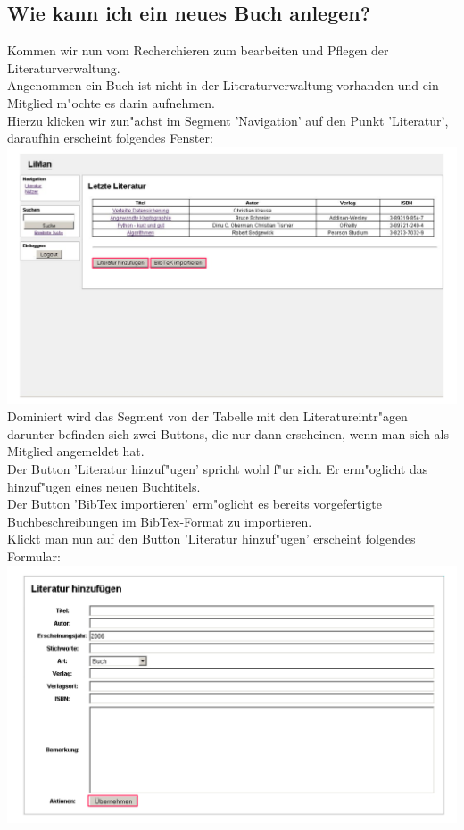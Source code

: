 \subsection{Wie kann ich ein neues Buch anlegen?}
Kommen wir nun vom Recherchieren zum bearbeiten und Pflegen der Literaturverwaltung.\\
Angenommen ein Buch ist nicht in der Literaturverwaltung vorhanden und ein Mitglied m"ochte es darin aufnehmen.\\
Hierzu klicken wir zun"achst im Segment 'Navigation' auf den Punkt 'Literatur', daraufhin erscheint folgendes Fenster:\\
\includegraphics[scale=0.8]{lit_ins.pdf}\\
Dominiert wird das Segment von der Tabelle mit den Literatureintr"agen darunter befinden sich zwei Buttons, die nur dann erscheinen, wenn man sich als Mitglied angemeldet hat.\\
Der Button 'Literatur hinzuf"ugen' spricht wohl f"ur sich. Er erm"oglicht das hinzuf"ugen eines neuen Buchtitels.\\
Der Button 'BibTex importieren' erm"oglicht es bereits vorgefertigte Buchbeschreibungen im BibTex-Format zu importieren.\\
Klickt man nun auf den Button 'Literatur hinzuf"ugen' erscheint folgendes Formular:\\
\includegraphics[scale=0.8]{lit_ins1.pdf}\\